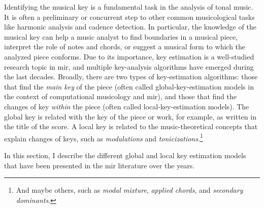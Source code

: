 

Identifying the musical key is a fundamental task in the
analysis of tonal music. It is often a preliminary or
concurrent step to other common musicological tasks like
harmonic analysis and cadence detection. In particular, the
knowledge of the musical key can help a music analyst to
find boundaries in a musical piece, interpret the role of
notes and chords, or suggest a musical form to which the
analyzed piece conforms. Due to its importance, key
estimation is a well-studied research topic in \gls{mir}, and
multiple key-analysis algorithms have emerged during the
last decades. Broadly, there are two types of key-estimation
algorithms: those that find the \emph{main key} of the piece
(often called global-key-estimation models in the context of
computational musicology and \gls{mir}), and those that find the
changes of key \emph{within} the piece (often called
local-key-estimation models). The global key is related with
the key of the piece or work, for example, as written in the
title of the score.
A local key is related to the music-theoretical concepts
that explain changes of keys, such as \emph{modulations} and
\emph{tonicizations}.\footnote{And maybe others, such as
\emph{modal mixture}, \emph{applied chords}, and
\emph{secondary dominants}.}

In this section, I describe the different global and local
key estimation models that have been presented in the \gls{mir}
literature over the years.
